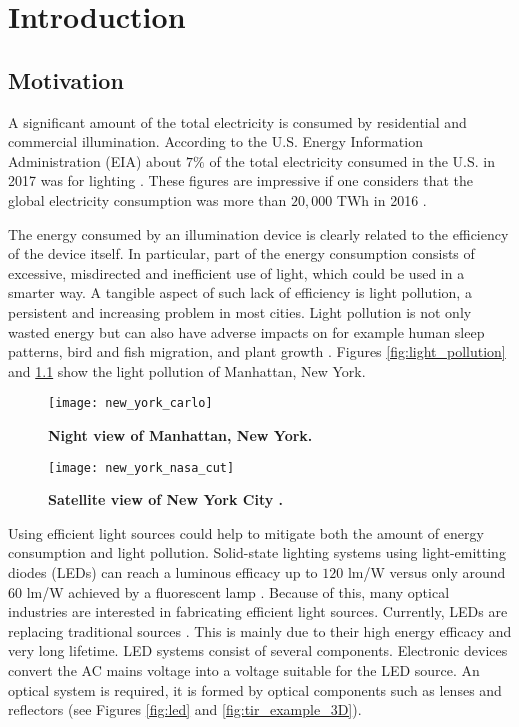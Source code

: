 \chapter{Introduction}
\section{Motivation}
A significant amount of the total electricity is consumed by residential and commercial illumination.
According to the U.S. Energy Information Administration (EIA) about $7\%$ of the total electricity consumed in the U.S. in 2017 was for lighting \cite{electricity_light}. These figures are impressive if one considers that the global electricity consumption was more than $20,\!000$ TWh in 2016 \cite{statistic}. 

The energy consumed by an illumination device is clearly related to the efficiency of the device itself. 
In particular, part of the energy consumption consists of excessive, misdirected and inefficient use of light, which could be used in a smarter way. A tangible aspect of such lack of efficiency is light pollution, a persistent and increasing problem in most cities. Light pollution is not only wasted energy but can also have adverse impacts on for example human sleep patterns, bird and fish migration, and plant growth \cite{bergesen2016potential}. Figures \ref{fig:light_pollution} and \ref{fig:light_pollution2} show the light pollution of Manhattan, New York.
\begin{figure}[t]
  \begin{minipage}[t]{0.49\textwidth}
    \texttt{[image: new\_york\_carlo]}
    \caption{\textbf{Night view of Manhattan, New York.}}
    \label{fig:light_pollution}
\end{minipage}
\hfill
 \begin{minipage}[t]{ 0.49\textwidth}
    \texttt{[image: new\_york\_nasa\_cut]}
    \caption{\textbf{Satellite view of New York City \cite{nasa_image}.}}
    \label{fig:light_pollution2}
\end{minipage}
  \end{figure}

Using efficient light sources could help to mitigate both the amount of energy consumption and light pollution. %
Solid-state lighting systems using light-emitting diodes (LEDs) can reach a luminous efficacy up to $120$ \textrm{lm}/\textrm{W} versus only around $60$ \textrm{lm}/\textrm{W} achieved by a fluorescent lamp \cite{bergesen2016potential, humphreys2008solid}.
Because of this, many optical industries are interested in fabricating efficient light sources.
Currently, LEDs are replacing traditional sources \cite{koshel2012illumination}. 
This is mainly due to their high energy efficacy and very long lifetime. 
LED systems consist of several components. 
Electronic devices convert the AC mains voltage into a voltage suitable for the LED source.
An optical system is required, it is formed by optical components such as lenses and reflectors \cite{moreno2008modeling} (see Figures \ref{fig:led} and \ref{fig:tir_example_3D}).

